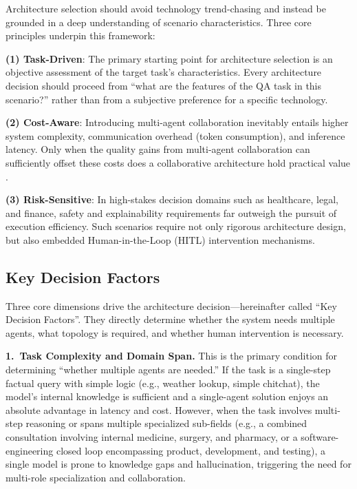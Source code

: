 Architecture selection should avoid technology trend-chasing and instead
be grounded in a deep understanding of scenario characteristics.
Three core principles underpin this framework:

\textbf{(1) Task-Driven}: The primary starting point for architecture
selection is an objective assessment of the target task's characteristics.
Every architecture decision should proceed from ``what are the features of
the QA task in this scenario?'' rather than from a subjective preference
for a specific technology.

\textbf{(2) Cost-Aware}: Introducing multi-agent collaboration inevitably
entails higher system complexity, communication overhead (token consumption),
and inference latency.
Only when the quality gains from multi-agent collaboration can sufficiently
offset these costs does a collaborative architecture hold practical value
\citep{han2024mast}.

\textbf{(3) Risk-Sensitive}: In high-stakes decision domains such as
healthcare, legal, and finance, safety and explainability requirements far
outweigh the pursuit of execution efficiency.
Such scenarios require not only rigorous architecture design, but also
embedded Human-in-the-Loop (HITL) intervention mechanisms.

\subsection{Key Decision Factors}
\label{sec:decision_factors}

Three core dimensions drive the architecture decision---hereinafter called
``Key Decision Factors''.
They directly determine whether the system needs multiple agents, what
topology is required, and whether human intervention is necessary.

\textbf{1.\ Task Complexity and Domain Span.}
This is the primary condition for determining ``whether multiple agents are
needed.''
If the task is a single-step factual query with simple logic (e.g., weather
lookup, simple chitchat), the model's internal knowledge is sufficient and
a single-agent solution enjoys an absolute advantage in latency and cost.
However, when the task involves multi-step reasoning or spans multiple
specialized sub-fields (e.g., a combined consultation involving internal
medicine, surgery, and pharmacy, or a software-engineering closed loop
encompassing product, development, and testing), a single model is prone
to knowledge gaps and hallucination, triggering the need for multi-role
specialization and collaboration.

